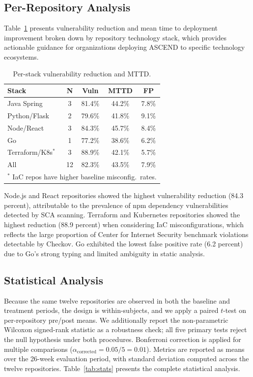 \documentclass{ieeeaccess}
\begin{document}
\subsection{Per-Repository Analysis}
Table~\ref{tab:perstack} presents vulnerability reduction and mean time to deployment improvement broken down by repository technology stack, which provides actionable guidance for organizations deploying ASCEND to specific technology ecosystems.

\begin{table}[!t]
\caption{Per-stack vulnerability reduction and MTTD.}
\label{tab:perstack}
\centering
\begin{tabular}{lcccc}
\hline
\textbf{Stack} & \textbf{N} & \textbf{Vuln} & \textbf{MTTD} & \textbf{FP} \\
\hline
Java Spring     & 3 & 81.4\% & 44.2\% & 7.8\% \\
Python/Flask    & 2 & 79.6\% & 41.8\% & 9.1\% \\
Node/React      & 3 & 84.3\% & 45.7\% & 8.4\% \\
Go              & 1 & 77.2\% & 38.6\% & 6.2\% \\
Terraform/K8s$^{*}$ & 3 & 88.9\% & 42.1\% & 5.7\% \\
\hline
All             & 12 & 82.3\% & 43.5\% & 7.9\% \\
\hline
\multicolumn{5}{l}{\footnotesize $^{*}$ IaC repos have higher baseline misconfig.\ rates.}
\end{tabular}
\end{table}

Node.js and React repositories showed the highest vulnerability reduction (84.3 percent), attributable to the prevalence of npm dependency vulnerabilities detected by SCA scanning. Terraform and Kubernetes repositories showed the highest reduction (88.9 percent) when considering IaC misconfigurations, which reflects the large proportion of Center for Internet Security benchmark violations detectable by Checkov. Go exhibited the lowest false positive rate (6.2 percent) due to Go's strong typing and limited ambiguity in static analysis.

\subsection{Statistical Analysis}
Because the same twelve repositories are observed in both the baseline and treatment periods, the design is within-subjects, and we apply a paired $t$-test on per-repository pre/post means. We additionally report the non-parametric Wilcoxon signed-rank statistic as a robustness check; all five primary tests reject the null hypothesis under both procedures. Bonferroni correction is applied for multiple comparisons ($\alpha_{\mathrm{corrected}} = 0.05/5 = 0.01$). Metrics are reported as means over the 26-week evaluation period, with standard deviation computed across the twelve repositories. Table~\ref{tab:stats} presents the complete statistical analysis.
\end{document}
